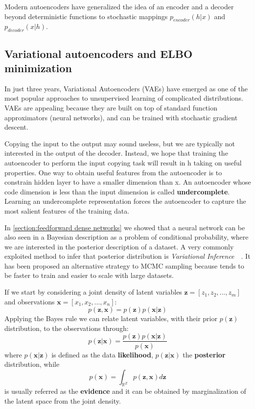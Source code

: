 Modern autoencoders have generalized the idea of an encoder and a decoder beyond deterministic functions to stochastic mappings $p_{encoder}(h | x)$ and $p_{decoder}(x | h)$.


\subsection{Variational autoencoders and ELBO minimization}
\label{section:VAE}
In just three years, Variational Autoencoders (VAEs) have emerged as one of the most popular approaches to unsupervised learning of complicated distributions. VAEs are appealing because they are built on top of standard function approximators (neural networks), and can be trained with stochastic gradient descent.

Copying the input to the output may sound useless, but we are typically not interested in the output of the decoder. Instead, we hope that training the autoencoder to perform the input copying task will result in h taking on useful properties. One way to obtain useful features from the autoencoder is to constrain hidden layer to have a smaller dimension than x. An autoencoder whose code dimension is less than the input dimension is called \textbf{undercomplete}. Learning an undercomplete representation forces the autoencoder to capture the most salient features of the training data.


In \cref{section:feedforward dense networks} we showed that a neural network can be also seen in a Bayesian description as a problem of conditional probability, where we are interested in the posterior description of a dataset. A very commonly exploited method to infer that posterior distribution is \textit{Variational Inference}~\cite{Jordan:1999:IVM:339248.339252}~\cite{MAL-001}. It has been proposed an alternative strategy to \ac{MCMC} sampling because tends to be faster to train and easier to scale with large datasets.

If we start by considering a joint density of latent variables $\bm{z} = [z_1, z_2, ...,z_m]$ and observations $\bm{x} = [x_1, x_2, ..., x_n]$:
\begin{equation}
    p(\bm{z},\bm{x}) = p(\bm{z}) p(\bm{x}|\bm{z})
\end{equation}
Applying the Bayes rule we can relate latent variables, with their prior $p(\bm{z})$ distribution, to the observations through:
\begin{equation}
    p(\bm{z}|\bm{x}) = \frac{p(\bm{z})p(\bm{x}|\bm{z})}{p(\bm{x})}
\end{equation}
where $p(\bm{x}|\bm{z})$ is defined as the data \textbf{likelihood}, $p(\bm{z}|\bm{x})$ the \textbf{posterior} distribution, while
\begin{equation}
    p(\bm{x}) = \int_{\mathbb{R}^Z} p(\bm{z}, \bm{x}) d\bm{z}
\end{equation}
is usually referred as the \textbf{evidence} and it can be obtained by marginalization of the latent space from the joint density.

